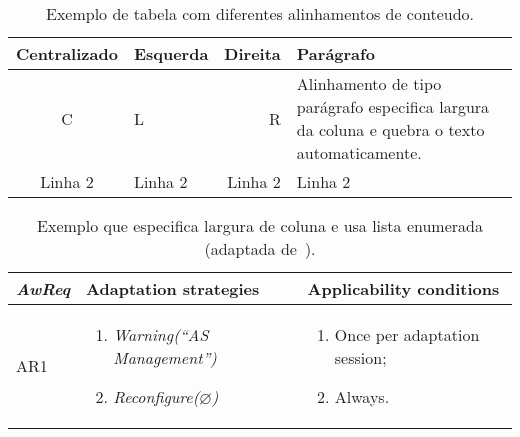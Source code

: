 \begin{table}
\caption{Exemplo de tabela com diferentes alinhamentos de conteudo.}
\label{tbl-dicaslatex-exemplo01}
\centering
\begin{tabular}{ | c | l | r | p{40mm} |}\hline
\textbf{Centralizado} & \textbf{Esquerda} & \textbf{Direita} & \textbf{Parágrafo}\\\hline
C & L & R & Alinhamento de tipo parágrafo especifica largura da coluna e quebra o texto automaticamente.\\
\hline
Linha 2 & Linha 2 & Linha 2 & Linha 2\\
\hline
\end{tabular}
\end{table}

\begin{table}
\caption{Exemplo que especifica largura de coluna e usa lista enumerada (adaptada de~\cite{souza-mylopoulos:spe13}).}
\label{tbl-dicaslatex-exemplo02}
\centering
\renewcommand{\arraystretch}{1.2}
\begin{small}
\begin{tabular}{ | p{15mm} | p{77mm} | p{55mm} |}\hline
\textbf{\textit{AwReq}} & \textbf{Adaptation strategies} & \textbf{Applicability conditions}\\\hline

AR1 &
\vspace{-2mm}\begin{enumerate}[topsep=0cm, partopsep=0cm, itemsep=0cm, parsep=0cm, leftmargin=0.5cm]
\item \textit{Warning(``AS Management'')}
\item \textit{Reconfigure($\varnothing$)}
\end{enumerate}\vspace{-4mm} &
\vspace{-2mm}\begin{enumerate}[topsep=0cm, partopsep=0cm, itemsep=0cm, parsep=0cm, leftmargin=0.5cm]
\item Once per adaptation session;
\item Always.
\end{enumerate}\vspace{-4mm}
\\\hline


\end{tabular}
\end{small}
\end{table}
